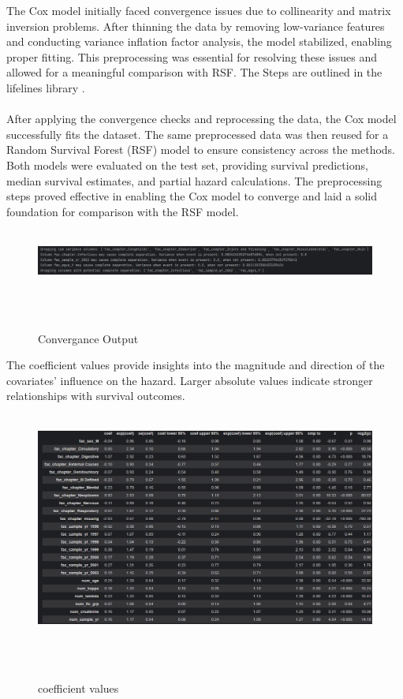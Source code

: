 \noindent The Cox model initially faced convergence issues due to collinearity and matrix inversion problems. After thinning the data by removing low-variance features and conducting variance inflation factor analysis, the model stabilized, enabling proper fitting. This preprocessing was essential for resolving these issues and allowed for a meaningful comparison with RSF. The Steps are outlined in the lifelines library \parencite{davidson-pilon_lifelines_2024}.
\\\\
\noindent After applying the convergence checks and reprocessing the data, the Cox model successfully fits the dataset. The same preprocessed data was then reused for a Random Survival Forest (RSF) model to ensure consistency across the methods. Both models were evaluated on the test set, providing survival predictions, median survival estimates, and partial hazard calculations. The preprocessing steps proved effective in enabling the Cox model to converge and laid a solid foundation for comparison with the RSF model.

\begin{figure}[h]
    \centering
    \includegraphics[width=\linewidth]{Figures/SURV/converge.png}
    \caption{Convergance Output}
    \label{fig:conv_out}
\end{figure}

\noindent The coefficient values provide insights into the magnitude and direction of the covariates' influence on the hazard. Larger absolute values indicate stronger relationships with survival outcomes.
\begin{figure}[h]
    \centering
    \includegraphics[width=\linewidth]{Figures/SURV/covariates.png}
    \caption{coefficient values}
    \label{fig:coefs}
\end{figure}

